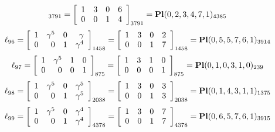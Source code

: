 \documentclass{article}
\begin{document}
{$$_{3791}
=
\left[
\begin{array}{*{4}c}
1  & 3  & 0  & 6\\
0  & 0  & 1  & 4\\
\end{array}
\right]_{3791}
={\rm\bf Pl}(0,2,3,4,7,1 )_{4385}$$
$$
\ell_{96} = 
\left[
\begin{array}{*{4}{r}}
1 & \gamma^{5} & 0 & \gamma \\
0 & 0 & 1 & \gamma^{4}\\
\end{array}
\right]
_{1458}
=
\left[
\begin{array}{*{4}c}
1  & 3  & 0  & 2\\
0  & 0  & 1  & 7\\
\end{array}
\right]_{1458}
={\rm\bf Pl}(0,5,5,7,6,1 )_{3914}$$
$$
\ell_{97} = 
\left[
\begin{array}{*{4}{r}}
1 & \gamma^{5} & 1 & 0\\
0 & 0 & 0 & 1\\
\end{array}
\right]
_{875}
=
\left[
\begin{array}{*{4}c}
1  & 3  & 1  & 0\\
0  & 0  & 0  & 1\\
\end{array}
\right]_{875}
={\rm\bf Pl}(0,1,0,3,1,0 )_{239}$$
$$
\ell_{98} = 
\left[
\begin{array}{*{4}{r}}
1 & \gamma^{5} & 0 & \gamma^{5}\\
0 & 0 & 1 & \gamma^{5}\\
\end{array}
\right]
_{2038}
=
\left[
\begin{array}{*{4}c}
1  & 3  & 0  & 3\\
0  & 0  & 1  & 3\\
\end{array}
\right]_{2038}
={\rm\bf Pl}(0,1,4,3,1,1 )_{1375}$$
$$
\ell_{99} = 
\left[
\begin{array}{*{4}{r}}
1 & \gamma^{5} & 0 & \gamma^{4}\\
0 & 0 & 1 & \gamma^{4}\\
\end{array}
\right]
_{4378}
=
\left[
\begin{array}{*{4}c}
1  & 3  & 0  & 7\\
0  & 0  & 1  & 7\\
\end{array}
\right]_{4378}
={\rm\bf Pl}(0,6,5,7,6,1 )_{3915}$$
}
\end{document}
